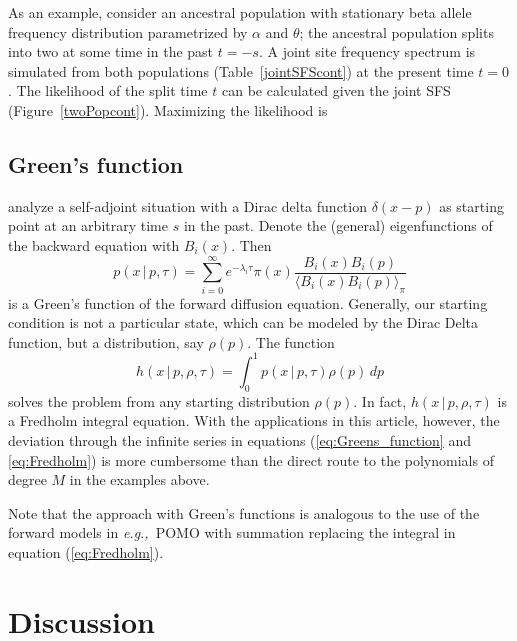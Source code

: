\documentclass[preprint]{elsarticle}
\newcommand\given{{\,|\,}}
\newcommand\eg{{\it e.g.,}}
\begin{document}
As an example, consider an ancestral population with stationary beta allele frequency distribution parametrized by $\alpha$ and $\theta$; the ancestral population splits into two at some time in the past $t=-s$. A joint site frequency spectrum is simulated from both populations (Table~\ref{jointSFScont}) at the present time $t=0$. The likelihood of the split time $t$ can be calculated given the joint SFS (Figure~\ref{twoPopcont}). Maximizing the likelihood is 

\subsection{Green's function}

\citet{Song12} analyze a self-adjoint situation with a Dirac delta function $\delta(x-p)$ as starting point at an arbitrary time $s$ in the past. Denote the (general) eigenfunctions of the backward equation with $B_i(x)$. Then 
\begin{equation}\label{eq:Greens_function}
    p(x\given p,\tau)=\sum_{i=0}^\infty e^{-\lambda_i \tau}\pi(x) \frac{B_i(x)B_i(p)}{\langle B_i(x)B_i(p) \rangle_{\pi}}
\end{equation}
is a Green's function of the forward diffusion equation. %
Generally, our starting condition is not a particular state, which can be modeled by the Dirac Delta function, but a distribution, say $\rho(p)$. The function 
\begin{equation}\label{eq:Fredholm}
    h(x\given p,\rho,\tau)=\int_0^1 p(x\given p,\tau)\rho(p)\,dp
\end{equation}
solves the problem from any starting distribution $\rho(p)$. In fact, $h(x\given p,\rho,\tau)$ is a Fredholm integral equation. %
With the applications in this article, however, the deviation through the infinite series in equations (\ref{eq:Greens_function} and \ref{eq:Fredholm}) is more cumbersome than the direct route to the polynomials of degree $M$ in the examples above.

Note that the approach with Green's functions is analogous to the use of the forward models in \eg\ POMO \citep{DeMa13} with summation replacing the integral in equation (\ref{eq:Fredholm}).

\section{Discussion}
\end{document}
